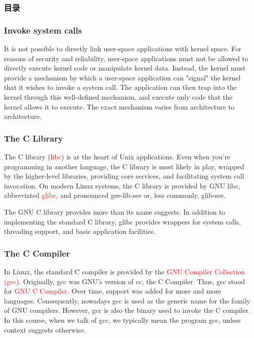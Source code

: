 \documentclass{beamer}
\begin{document}
\begin{frame}
\frametitle{目录}
\end{frame}
\begin{frame}
\frametitle{Invoke system calls}
It is not possible to directly link user-space applications with kernel space. For reasons of security and reliability, user-space applications must not be allowed to directly execute kernel code or manipulate kernel data. Instead, the kernel must provide a mechanism by which a user-space application can "signal" the kernel that it wishes to invoke a system call. The application can then trap into the kernel through this well-defined mechanism, and execute only code that the kernel allows it to execute. The exact mechanism varies from architecture to architecture.
\end{frame}


\begin{frame}
\frametitle{The C Library}
The C library (\textcolor{red}{libc}) is at the heart of Unix applications. Even when you're programming in another language, the C library is most likely in play, wrapped by the higher-level libraries, providing core services, and facilitating system call invocation. On modern Linux systems, the C library is provided by GNU libc, abbreviated \textcolor{red}{glibc}, and pronounced gee-lib-see or, less commonly, glib-see.

The GNU C library provides more than its name suggests. In addition to implementing the standard C library, glibc provides wrappers for system calls, threading support, and basic application facilities.
\end{frame}

\begin{frame}
\frametitle{The C Compiler}
In Linux, the standard C compiler is provided by the \textcolor{red}{GNU Compiler Collection (gcc)}. Originally, gcc was GNU's version of cc, the C Compiler. Thus, gcc stood for \textcolor{red}{GNU C Compiler}. Over time, support was added for more and more languages. Consequently, nowadays gcc is used as the generic name for the family of GNU compilers. However, gcc is also the binary used to invoke the C compiler. In this course, when we talk of gcc, we typically mean the program gcc, unless context suggests otherwise.

\end{frame}
\end{document}
